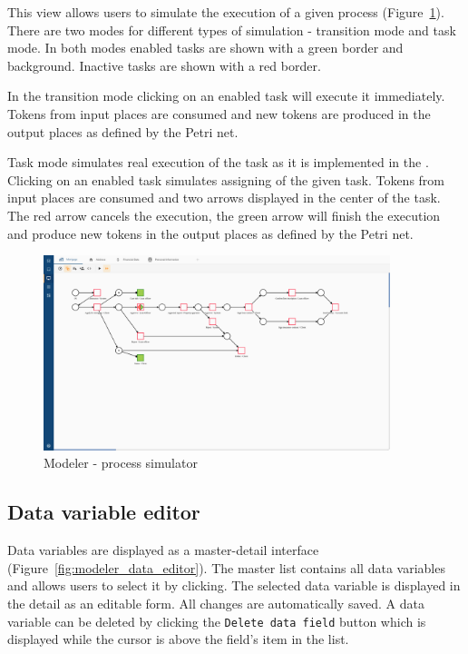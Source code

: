 This view allows users to simulate the execution of a given process (Figure~\ref{fig:modeler_process_simulator}).
There are two modes for different types of simulation - transition mode and task mode.
In both modes enabled tasks are shown with a green border and background.
Inactive tasks are shown with a red border.

In the transition mode clicking on an enabled task will execute it immediately.
Tokens from input places are consumed and new tokens are produced in the output places as defined by the Petri net.

Task mode simulates real execution of the task as it is implemented in the \engine.
Clicking on an enabled task simulates assigning of the given task.
Tokens from input places are consumed and two arrows displayed in the center of the task.
The red arrow cancels the execution, the green arrow will finish the execution and produce new tokens in the output places as defined by the Petri net.

\begin{figure}[h!]
  \centering
  \includegraphics[width=0.9\textwidth]{images/modeler_process_simulator.png}
  \caption{Modeler - process simulator}
  \label{fig:modeler_process_simulator}
\end{figure}

\subsection{Data variable editor}\label{subsec:data-variable-editor}

Data variables are displayed as a master-detail interface (Figure~\ref{fig:modeler_data_editor}).
The master list contains all data variables and allows users to select it by clicking.
The selected data variable is displayed in the detail as an editable form.
All changes are automatically saved.
A data variable can be deleted by clicking the \texttt{Delete data field} button which is displayed while the cursor is above the field's item in the list.

